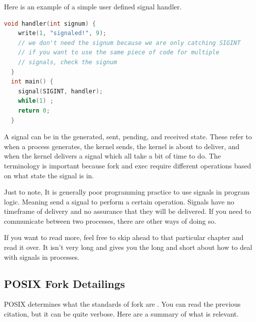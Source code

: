 Here is an example of a simple user defined signal handler.

\begin{lstlisting}[language=C]
  void handler(int signum) {
    write(1, "signaled!", 9);
    // we don't need the signum because we are only catching SIGINT
    // if you want to use the same piece of code for multiple
    // signals, check the signum
  }
  int main() {
    signal(SIGINT, handler);
    while(1) ;
    return 0;
  }
\end{lstlisting}

A signal can be in the generated, sent, pending, and received state. These refer to when a process generates, the kernel sends, the kernel is about to deliver, and when the kernel delivers a signal which all take a bit of time to do.
The terminology is important because fork and exec require different operations based on what state the signal is in.

Just to note, It is generally poor programming practice to use signals in program logic.
Meaning send a signal to perform a certain operation.
Signals have no timeframe of delivery and no assurance that they will be delivered.
If you need to communicate between two processes, there are other ways of doing so.


If you want to read more, feel free to skip ahead to that particular chapter and read it over. It isn't very long and gives you the long and short about how to deal with signals in processes.

\subsection{POSIX Fork Detailings}

POSIX determines what the standards of fork are \cite{fork_2018}.
You can read the previous citation, but it can be quite verbose.
Here are a summary of what is relevant.


